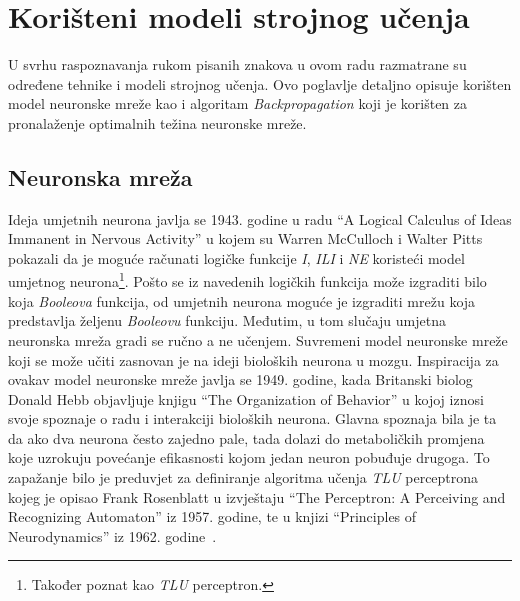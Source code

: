 \chapter{Korišteni modeli strojnog učenja}
\label{ch:koristeni-modeli-strojnog-ucenja}
U svrhu raspoznavanja rukom pisanih znakova u ovom radu razmatrane su određene tehnike i modeli strojnog učenja. Ovo
poglavlje detaljno opisuje korišten model neuronske mreže kao i algoritam \emph{Backpropagation} koji je korišten za
pronalaženje optimalnih težina neuronske mreže.


\section{Neuronska mreža}
\label{sec:neuronska-mreza}
Ideja umjetnih neurona javlja se 1943. godine u radu ``A Logical Calculus of Ideas Immanent in Nervous Activity'' u
kojem su Warren McCulloch i Walter Pitts pokazali da je moguće računati logičke funkcije \emph{I}, \emph{ILI} i
\emph{NE} koristeći model umjetnog neurona\footnote{Također poznat kao \emph{TLU} perceptron.}. Pošto se iz navedenih
logičkih funkcija može izgraditi bilo koja \emph{Booleova} funkcija, od umjetnih neurona moguće je izgraditi mrežu koja
predstavlja željenu \emph{Booleovu} funkciju. Međutim, u tom slučaju umjetna neuronska mreža gradi se ručno a ne
učenjem. Suvremeni model neuronske mreže koji se može učiti zasnovan je na ideji bioloških neurona u mozgu. Inspiracija
za ovakav model neuronske mreže javlja se 1949. godine, kada Britanski biolog Donald Hebb objavljuje knjigu
``The Organization of Behavior'' u kojoj iznosi svoje spoznaje o radu i interakciji bioloških neurona. Glavna spoznaja
bila je ta da ako dva neurona često zajedno pale, tada dolazi do metaboličkih promjena koje uzrokuju povećanje
efikasnosti kojom jedan neuron pobuđuje drugoga. To zapažanje bilo je preduvjet za definiranje algoritma učenja
\emph{TLU} perceptrona kojeg je opisao Frank Rosenblatt u izvještaju
``The Perceptron: A Perceiving and Recognizing Automaton'' iz 1957. godine, te u knjizi ``Principles of Neurodynamics''
iz 1962. godine\ \citep{cupic2013}.


